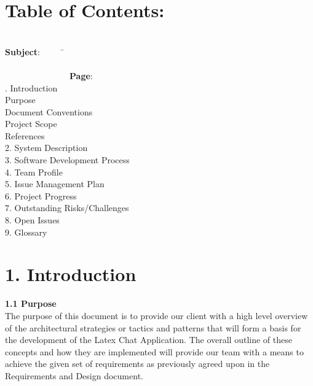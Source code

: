 \documentclass[29pt,a4paper]{moderncv}
\begin{document}
\section{\textbf{Table of Contents:}}
\begin{tabbing}
\\\textbf{Subject}: ~~~~~\= ~~~~~~~~~~~~~~~~~~~~~~~~~~~~~~~~~~~~~~~~~~~~~~~~~~~~~~~~~~~~~~~~~~~~~~~~~~~~~~~~~~~~~~~\= \textbf{Page}:
\\. Introduction \> \\							
 Purpose 	\\							
 Document Conventions 					\\
 Project Scope 							\\
 References 							\\
2. System Description \> 					\\
3. Software Development Process \> 				\\
4. Team Profile\>  				\\
5. Issue Management Plan \>  	\\
6. Project Progress \>  	\\
7. Outstanding Risks/Challenges \>  	\\
8. Open Issues \>  	\\
9. Glossary \>  	\\
\end{tabbing}

\newpage
	\section*{\textbf{1. Introduction}}
	\vspace{4mm}
	
		\textbf{1.1 Purpose}
			\\The purpose of this document is to provide our client with a high level overview of the architectural strategies or tactics and patterns that will form a basis for the development of the Latex Chat Application. The overall outline of these concepts and how they are implemented will provide our team with a means to achieve the given set of requirements as previously agreed upon in the Requirements and Design document.\\
		\vspace{1mm}
		
\end{document}
